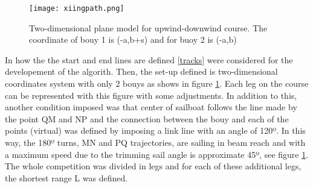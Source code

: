 \begin{figure}
\centering
  \texttt{[image: xiingpath.png]}
 \caption{Two-dimensional plane model for upwind-downwind course. The coordinate of bouy 1 is (-a,b+s) and for buoy 2 is (-a,b) \cite{xing2012path} }
\label{xiingfig1}
\end{figure}
In  \cite{xing2012path} how the the start and end lines are defined \ref{tracks} were considered for the developement of the algorith. Then,  the set-up defined is two-dimensional coordinates system with only 2 bouys as shows in figure \ref{xiingfig1}.  Each leg on the course can be represented with this figure with some adjustments. 
In addition to this, another condition imposed was that center of sailboat follows the line made by the point QM and NP and the connection between the bouy and each of the points (virtual) was defined by imposing a link line with an angle of 120º. In this way, the 180º turns, MN and PQ trajectories, are sailing in beam reach  and with a maximum speed due to the trimming sail angle is approximate 45º, see figure \ref{xiingfig1}. %
The whole competition was divided in legs and %
for each of these additional legs, the shortest range L was defined.\\ %
